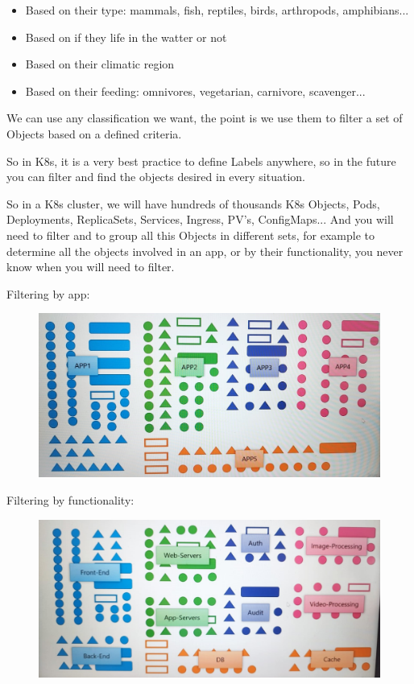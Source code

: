 \documentclass{article}
\begin{document}
\begin{itemize}
    \item Based on their type: mammals, fish, reptiles, birds, arthropods, amphibians...
    \item Based on if they life in the watter or not
    \item Based on their climatic region
    \item Based on their feeding: omnivores, vegetarian, carnivore, scavenger...
\end{itemize}

We can use any classification we want, the point is we use them to filter a set of Objects based on a defined criteria.

So in K8s, it is a very best practice to define Labels anywhere, so in the future you can filter and find the objects desired in every situation.

So in a K8s cluster, we will have hundreds of thousands K8s Objects, Pods, Deployments, ReplicaSets, Services, Ingress, PV's, ConfigMaps... And you will need to filter and to group all this Objects in different sets, for example to determine all the objects involved in an app, or by their functionality, you never know when you will need to filter.

Filtering by app:

\begin{figure}[H]
    \centering
    \includegraphics[width=\textwidth]{pictures/sch4.jpg}
\end{figure}

Filtering by functionality:

\begin{figure}[H]
    \centering
    \includegraphics[width=\textwidth]{pictures/sch3.png}
\end{figure}
\end{document}
